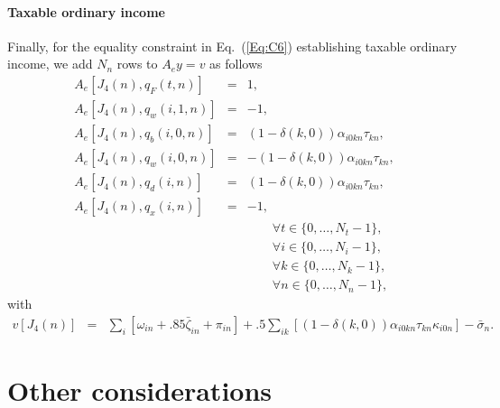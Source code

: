 \documentclass{report}[fleqn,12pt]
\begin{document}
\paragraph*{Taxable ordinary income}
Finally, for the equality constraint in Eq.~(\ref{Eq:C6}) establishing taxable
ordinary income, we add $N_n$ rows to $A_ey = v$ as follows
\begin{eqnarray}
	A_e[J_4(n), q_F(t, n)] &=& 1, \nonumber \\
	A_e[J_4(n), q_w(i, 1, n)] &=& -1, \nonumber \\
	A_e[J_4(n), q_b(i, 0, n)] &=&  (1 - \delta(k, 0))\alpha_{i0kn}\tau_{kn}, \\
	A_e[J_4(n), q_w(i, 0, n)] &=& -(1 - \delta(k, 0))\alpha_{i0kn}\tau_{kn}, \nonumber \\
	A_e[J_4(n), q_d(i, n)] &=&     (1 - \delta(k, 0))\alpha_{i0kn}\tau_{kn}, \nonumber \\
	A_e[J_4(n), q_x(i, n)] &=& -1, \nonumber \\
	&&\qquad\forall t \in \{0,\ldots, N_t-1\},\nonumber\\
	&&\qquad\forall i \in \{0,\ldots, N_i-1\},\nonumber\\
	&&\qquad\forall k \in \{0,\ldots, N_k-1\},\nonumber\\
	&&\qquad\forall n \in \{0,\ldots, N_n-1\}, \nonumber
\end{eqnarray}
with
\begin{eqnarray}
	v[J_4(n)] &=& 
	\sum_i [\omega_{in} + .85\bar\zeta_{in}  + \pi_{in}]
	+ .5\sum_{ik} [(1-\delta(k, 0))\alpha_{i0kn}\tau_{kn}\kappa_{i0n}]
	- \bar{\sigma}_n.
\end{eqnarray}

\section{Other considerations}
\end{document}
